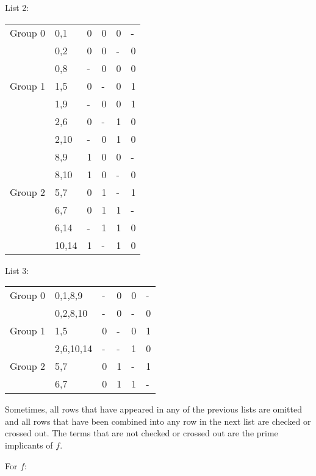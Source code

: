 \documentclass[a4paper,12pt]{article}
\begin{document}
\begin{itemize}
\begin{itemize}
\begin{itemize}
\begin{itemize}
\begin{itemize}
\begin{itemize}
\begin{itemize}
List 2:
\begin{longtable}[c]{|c|m|mmmm|}
\hline
Group 0 & 0,1 & 0 & 0 & 0 & - \\\cline{2-6}
& 0,2 & 0 & 0 & - & 0 \\\cline{2-6}
& 0,8 & - & 0 & 0 & 0 \\\hline
Group 1 & 1,5 & 0 & - & 0 & 1 \\\cline{2-6}
& 1,9 & - & 0 & 0 & 1 \\\cline{2-6}
& 2,6 & 0 & - & 1 & 0 \\\cline{2-6}
& 2,10 & - & 0 & 1 & 0 \\\cline{2-6}
& 8,9 & 1 & 0 & 0 & - \\\cline{2-6}
& 8,10 & 1 & 0 & - & 0 \\\hline
Group 2 & 5,7 & 0 & 1 & - & 1 \\\cline{2-6}
& 6,7 & 0 & 1 & 1 & - \\\cline{2-6}
& 6,14 & - & 1 & 1 & 0 \\\cline{2-6}
& 10,14 & 1 & - & 1 & 0 \\\hline
\end{longtable}

List 3:
\begin{longtable}[c]{|c|m|mmmm|}
\hline
Group 0 & 0,1,8,9 & - & 0 & 0 & - \\\cline{2-6}
& 0,2,8,10 & - & 0 & - & 0 \\\hline
Group 1 & 1,5 & 0 & - & 0 & 1 \\\cline{2-6}
& 2,6,10,14 & - & - & 1 & 0 \\\hline
Group 2 & 5,7 & 0 & 1 & - & 1 \\\cline{2-6}
& 6,7 & 0 & 1 & 1 & - \\\hline
\end{longtable}

Sometimes, all rows that have appeared in any of the previous lists are omitted and all rows that have been combined into any row in the next list are checked or crossed out. The terms that are not checked or crossed out are the prime implicants of $f$.

For $f$:


\end{itemize}
\end{itemize}
\end{itemize}
\end{itemize}
\end{itemize}
\end{itemize}
\end{itemize}
\end{document}
